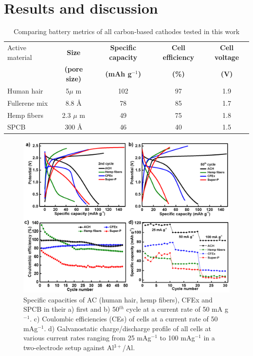 \section{Results and discussion}

\begin{table}[h!]
\caption{Comparing battery metrics of all carbon-based cathodes tested in this work} \label{table1bm}
\begin{center}
\begin{tabular}{|lcccc|}
\hline
Active material & {\textbf{Size}} & {\textbf{Specific capacity}} & {\textbf{Cell efficiency}} & {\textbf{Cell voltage}}\\
 & {\textbf{(pore size)}} & {\textbf{(mAh g$^{-1}$)}} & {\textbf{(\%)}} & {\textbf{(V)}}\\
\hline
Human hair & 5${\mu}$ m & 102 & 97 & 1.9 \\
Fullerene mix & 8.8 \AA & 78 & 85 & 1.7 \\
Hemp fibers & 2.3 $\mu$ m & 49 & 75 & 1.8 \\
SPCB & 300 \AA & 46 & 40 & 1.5 \\
\hline  %
\end{tabular}
\end{center}
\end{table}

\begin{figure}[h]
  \centering
  \includegraphics[width=\textwidth]{Figures/chap5fig/cdcall}
    \caption{Specific capacities of AC (human hair, hemp fibers), CFEx and SPCB in their a) first and b) 50$^{th}$ cycle at a current rate of 50 mA g$^{-1}$. c) Coulombic efficiencies (CEs) of cells at a current rate of 50 mAg$^{-1}$. d) Galvanostatic charge/discharge profile of all cells at various current rates ranging from 25 mAg$^{-1}$ to 100 mAg$^{-1}$ in a two-electrode setup against Al$^{3+}$/Al.}
  \label{Figures/chap5fig:cdcall}
\end{figure}

